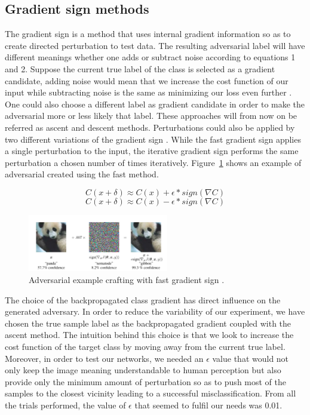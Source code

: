 \documentclass[runningheads,a4paper]{llncs}
\begin{document}
\subsection{Gradient sign methods}

The gradient sign is a method that uses internal gradient information so as to create directed perturbation to test data. The resulting adversarial label will have different meanings whether one adds or subtract noise according to equations 1 and 2. Suppose the current true label of the class is selected as a gradient candidate, adding noise would mean that we increase the cost function of our input while subtracting noise is the same as minimizing our loss even further \cite{goodfellow2016_book}. One could also choose a different label as gradient candidate in order to make the adversarial more or less likely that label. These approaches will from now on be referred as ascent and descent methods. Perturbations could also be applied by two different variations of the gradient sign \cite{goodfellow2014}. While the fast gradient sign applies a single perturbation to the input, the iterative gradient sign performs the same perturbation a chosen number of times iteratively. Figure~\ref{fig:fgsm_craft} shows an example of adversarial created using the fast method.


\begin{equation}
C(x + \delta)\approx C(x) + \epsilon * sign(\nabla C)
\end{equation}
\begin{equation}
C(x + \delta)\approx C(x) - \epsilon * sign(\nabla C)
\end{equation}
\begin{figure}
	\centering
	\includegraphics[height=2.5cm]{panda.png}
	\caption{Adversarial example crafting with fast gradient sign \cite{goodfellow2014}.}
	\label{fig:fgsm_craft}
\end{figure}

The choice of the backpropagated class gradient has direct influence on the generated adversary. In order to reduce the variability of our experiment, we have chosen the true sample label as the backpropagated gradient coupled with the ascent method. The intuition behind this choice is that we look to increase the cost function of the target class by moving away from the current true label. Moreover, in order to test our networks, we needed an $\epsilon$ value that would not only keep the image meaning understandable to human perception but also provide only the minimum amount of perturbation so as to push most of the samples to the closest vicinity leading to a successful misclassification. From all the trials performed, the value of $\epsilon$ that seemed to fulfil our needs was 0.01. 
\end{document}
